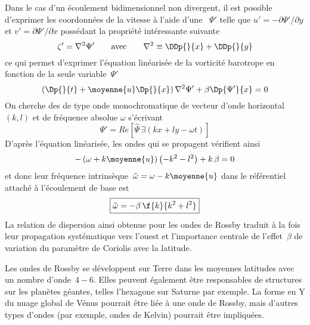 \sk
Dans le cas d'un écoulement bidimensionnel non divergent,
il est possible d'exprimer les coordonnées de la vitesse
à l'aide d'une ~$\Psi'$ telle que
$u' = - \partial \Psi' / \partial y$ et $v' = \partial \Psi' / \partial x$
\noindent possédant la propriété intéressante suivante
\[
\zeta' = \nabla^2 \Psi'
\qquad
\textrm{avec}
\qquad
\nabla^2 \equiv \DDp{}{x} + \DDp{}{y}
\]
\noindent ce qui permet d'exprimer l'équation linéarisée de la vorticité barotrope
en fonction de la seule variable~$\Psi'$
\[
\left( \Dp{}{t} + \moyenne{u} \Dp{}{x} \right) \nabla^2 \Psi' + \beta \Dp{\Psi'}{x} = 0
\]
\noindent On cherche des 
de type onde monochromatique 
de vecteur d'onde horizontal~$(k,l)$ 
et de fréquence absolue $\omega$
s'écrivant
\[
\Psi' = Re \left[ \hat{\Psi} \, \exi{(kx+ly-\omega t)} \right]
\]
\noindent D'après l'équation linéarisée, les ondes
qui se propagent vérifient ainsi
\[
- \left( \omega + k \moyenne{u} \right) \left( - k^2 - l^2 \right) + k\,\beta = 0
\]
et donc leur fréquence intrinsèque~$\tilde{\omega} = \omega - k\moyenne{u}$ 
dans le référentiel attaché à l'écoulement de base est
\[
\boxed{
\tilde{\omega} = - \beta \, \f{k}{k^2+l^2}
}
\]
\noindent La relation de dispersion ainsi obtenue pour
les ondes de Rossby traduit à la fois leur
propagation systématique vers l'ouest
et l'importance centrale de l'effet~$\beta$ 
de variation du paramètre de Coriolis avec la latitude.


\sk
Les ondes de Rossby se développent sur Terre
dans les moyennes latitudes avec un nombre d'onde~$4-6$.
Elles peuvent également être responsables de structures 
sur les planètes géantes, telles l'hexagone sur Saturne par exemple.
La forme en Y du nuage global de Vénus pourrait être liée
à une onde de Rossby, mais d'autres types d'ondes 
(par exemple, ondes de Kelvin) pourrait être impliquées.
